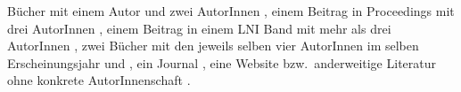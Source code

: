 \documentclass{article}
\begin{document}
Bücher mit einem Autor \cite{Ez10} und zwei AutorInnen \cite{AB00}, einem Beitrag in Proceedings mit drei AutorInnen \cite{ABC01}, einem Beitrag in einem LNI Band mit mehr als drei AutorInnen \cite{Az09}, zwei Bücher mit den jeweils selben vier AutorInnen im selben Erscheinungsjahr \cite{Wa14} und \cite{Wa14b}, ein Journal \cite{Gl06}, eine Website \cite{GI14} bzw.\ anderweitige Literatur ohne konkrete AutorInnenschaft \cite{XX14}.

\printbibliography
\end{document}
